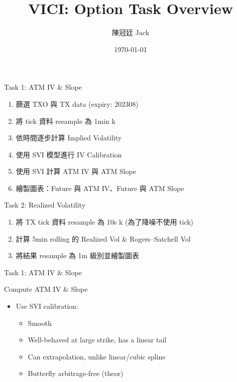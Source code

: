 \documentclass[xe, 12pt]{beamer}
\title[VICI: Option Task Overview]{VICI: Option Task Overview}
\author[陳冠廷 Jack]{陳冠廷 Jack}
\institute[MATH, NTHU]{
  \normalsize{\small Department of Mathematics, \\
  National Tsing Hua University}
}
\date[\today]{\today}
\begin{document}
\frame{\titlepage}

\begin{frame}{Task 1: ATM IV \& Slope}
\begin{enumerate}
\item 篩選 TXO 與 TX data (expiry: \textsf{202308})
\item 將 tick 資料 resample 為 1min k
\item 依時間逐步計算 Implied Volatility
\item 使用 SVI 模型進行 IV Calibration
\item 使用 SVI 計算 ATM IV 與 ATM Slope
\item 繪製圖表：Future 與 ATM IV、Future 與 ATM Slope
\end{enumerate}
\end{frame}

\begin{frame}{Task 2: Realized Volatility}
\begin{enumerate}
\item 將 TX tick 資料 resample 為 10s k (為了降噪不使用 tick)
\item 計算 5min rolling 的 Realized Vol \& Rogers–Satchell Vol
\item 將結果 resample 為 1m 級別並繪製圖表
\end{enumerate}
\end{frame}

\begin{frame}
\begin{center}
\Large \textsf{Task 1: ATM IV \& Slope}
\end{center}
\end{frame}

\begin{frame}{Compute ATM IV \& Slope}
\begin{itemize}
\item Use SVI calibration:
  \begin{itemize}
  \item Smooth
  \item Well-behaved at large strike, has a linear tail
  \item Can extrapolation, unlike linear/cubic spline
  \item Butterfly arbitrage‐free (theor)
  \end{itemize}
\end{itemize}
\end{frame}
\end{document}
